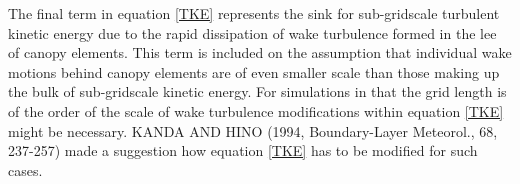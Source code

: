 \documentclass[11pt,a4paper,titlepage]{scrreprt}
\begin{document}
The final term in equation \ref{TKE} represents the sink for sub-gridscale turbulent kinetic energy 
due to the rapid dissipation of wake turbulence formed in the lee of canopy elements. This term is included 
on the assumption that individual wake motions behind canopy elements are of even smaller scale than those 
making up the bulk of sub-gridscale kinetic energy. For simulations in that the grid length is of the 
order of the scale of wake turbulence modifications within equation \ref{TKE} might be necessary. KANDA 
AND HINO (1994, Boundary-Layer Meteorol., 68, 237-257) made a suggestion how equation \ref{TKE} has to be 
modified for such cases. 
\end{document}
